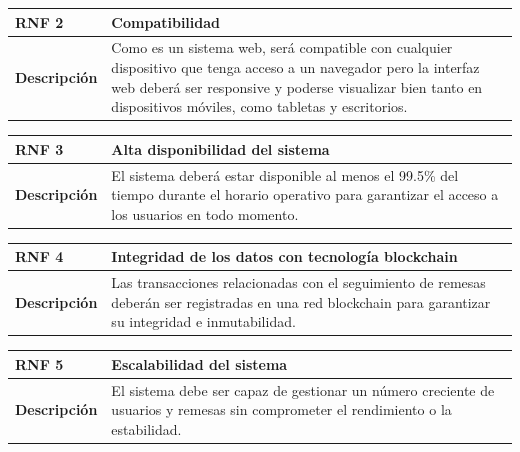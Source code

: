 \begin{table}[H]
     \renewcommand{\arraystretch}{3}
\centering
\small
\begin{tabularx}{\textwidth}{|l|X|}
\hline
\rowcolor[HTML]{9AFF99} 
\textbf{RNF 2}       & \textbf{Compatibilidad} \\ \hline
\textbf{Descripción} & Como es un sistema web, será compatible con cualquier dispositivo que tenga acceso a un navegador pero la interfaz web deberá ser responsive y poderse visualizar bien tanto en dispositivos móviles, como tabletas y escritorios. \\ \hline
\end{tabularx}
\end{table}

\begin{table}[H]
    \renewcommand{\arraystretch}{3}
    \centering
    \small
    \begin{tabularx}{\textwidth}{|l|X|}
        \hline
        \rowcolor[HTML]{9AFF99} 
        \textbf{RNF 3}       & \textbf{Alta disponibilidad del sistema} \\ \hline
        \textbf{Descripción} & El sistema deberá estar disponible al menos el 99.5\% del tiempo durante el horario operativo para garantizar el acceso a los usuarios en todo momento. \\ \hline
    \end{tabularx}
\end{table}

\begin{table}[H]
    \renewcommand{\arraystretch}{3}
    \centering
    \small
    \begin{tabularx}{\textwidth}{|l|X|}
        \hline
        \rowcolor[HTML]{9AFF99} 
        \textbf{RNF 4}       & \textbf{Integridad de los datos con tecnología blockchain} \\ \hline
        \textbf{Descripción} & Las transacciones relacionadas con el seguimiento de remesas deberán ser registradas en una red blockchain para garantizar su integridad e inmutabilidad. \\ \hline
    \end{tabularx}
\end{table}

\begin{table}[H]
    \renewcommand{\arraystretch}{3}
    \centering
    \small
    \begin{tabularx}{\textwidth}{|l|X|}
        \hline
        \rowcolor[HTML]{9AFF99} 
        \textbf{RNF 5}       & \textbf{Escalabilidad del sistema} \\ \hline
        \textbf{Descripción} & El sistema debe ser capaz de gestionar un número creciente de usuarios y remesas sin comprometer el rendimiento o la estabilidad. \\ \hline
    \end{tabularx}
\end{table}



